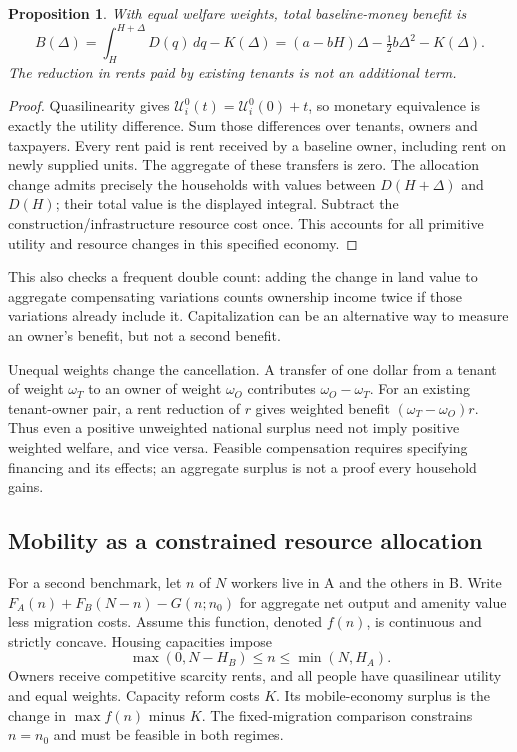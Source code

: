 \documentclass[11pt]{article}
\newtheorem{proposition}{Proposition}
\begin{document}
\begin{proposition}
With equal welfare weights, total baseline-money benefit is
\[
 B(\Delta)=\int_H^{H+\Delta}D(q)\,dq-K(\Delta)
 =(a-bH)\Delta-\tfrac12b\Delta^2-K(\Delta).
\]
The reduction in rents paid by existing tenants is not an additional term.
\end{proposition}
\begin{proof}
Quasilinearity gives $\mathcal U_i^0(t)=\mathcal U_i^0(0)+t$, so monetary
equivalence is exactly the utility difference. Sum those differences over
tenants, owners and taxpayers. Every rent paid is rent received by a
baseline owner, including rent on newly supplied units. The aggregate of
these transfers is zero. The allocation change admits precisely the
households with values between $D(H+\Delta)$ and $D(H)$; their total value
is the displayed integral. Subtract the construction/infrastructure
resource cost once. This accounts for all primitive utility and resource
changes in this specified economy.
\end{proof}
This also checks a frequent double count: adding the change in land value
to aggregate compensating variations counts ownership income twice if
those variations already include it. Capitalization can be an alternative
way to measure an owner's benefit, but not a second benefit.

Unequal weights change the cancellation. A transfer of one dollar from a
tenant of weight $\omega_T$ to an owner of weight $\omega_O$ contributes
$\omega_O-\omega_T$. For an existing tenant-owner pair, a rent reduction
of $r$ gives weighted benefit $(\omega_T-\omega_O)r$. Thus even a positive
unweighted national surplus need not imply positive weighted welfare,
and vice versa. Feasible compensation requires specifying financing and
its effects; an aggregate surplus is not a proof every household gains.

\subsection*{Mobility as a constrained resource allocation}
For a second benchmark, let $n$ of $N$ workers live in A and the others in
B. Write $F_A(n)+F_B(N-n)-G(n;n_0)$ for aggregate net output and amenity
value less migration costs. Assume this function, denoted $f(n)$, is
continuous and strictly concave. Housing capacities impose
\[
 \max(0,N-H_B)\leq n\leq\min(N,H_A).
\]
Owners receive competitive scarcity rents, and all people have quasilinear
utility and equal weights. Capacity reform costs $K$. Its mobile-economy
surplus is the change in $\max f(n)$ minus $K$. The fixed-migration
comparison constrains $n=n_0$ and must be feasible in both regimes.
\end{document}
